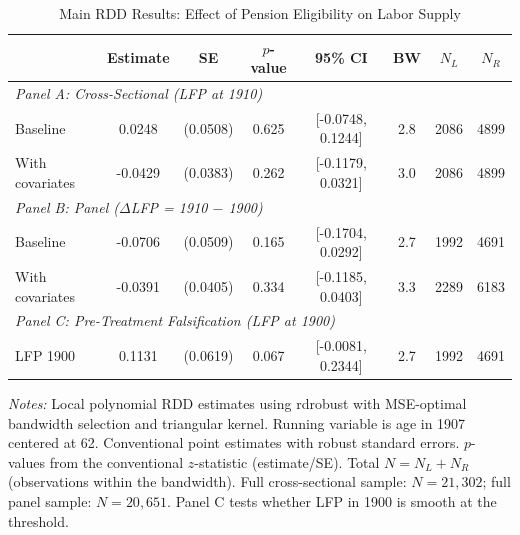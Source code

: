 \begin{table}[htbp]
\centering
\caption{Main RDD Results: Effect of Pension Eligibility on Labor Supply}
\label{tab:main_rdd}
\begin{tabular}{lccccccc}
\toprule
  & Estimate & SE & $p$-value & 95\% CI & BW & $N_L$ & $N_R$ \\
\midrule
\multicolumn{8}{l}{\textit{Panel A: Cross-Sectional (LFP at 1910)}} \\
  Baseline & 0.0248 & (0.0508) & 0.625 & [-0.0748, 0.1244] & 2.8 & 2086 & 4899 \\
  With covariates & -0.0429 & (0.0383) & 0.262 & [-0.1179, 0.0321] & 3.0 & 2086 & 4899 \\
\midrule
\multicolumn{8}{l}{\textit{Panel B: Panel ($\Delta$LFP = 1910 $-$ 1900)}} \\
  Baseline & -0.0706 & (0.0509) & 0.165 & [-0.1704, 0.0292] & 2.7 & 1992 & 4691 \\
  With covariates & -0.0391 & (0.0405) & 0.334 & [-0.1185, 0.0403] & 3.3 & 2289 & 6183 \\
\midrule
\multicolumn{8}{l}{\textit{Panel C: Pre-Treatment Falsification (LFP at 1900)}} \\
  LFP 1900 & 0.1131 & (0.0619) & 0.067 & [-0.0081, 0.2344] & 2.7 & 1992 & 4691 \\
\bottomrule
\end{tabular}
\begin{tablenotes}[flushleft]
\small
\item \textit{Notes:} Local polynomial RDD estimates using rdrobust with MSE-optimal bandwidth selection and triangular kernel. Running variable is age in 1907 centered at 62. Conventional point estimates with robust standard errors. $p$-values from the conventional $z$-statistic (estimate/SE). Total $N = N_L + N_R$ (observations within the bandwidth). Full cross-sectional sample: $N = 21{,}302$; full panel sample: $N = 20{,}651$. Panel C tests whether LFP in 1900 is smooth at the threshold.
\end{tablenotes}
\end{table}
